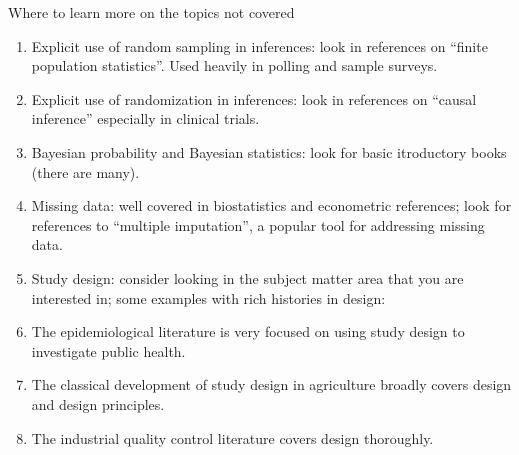 \documentclass[
  ignorenonframetext,
]{beamer}
\providecommand{\tightlist}{%
  \setlength{\itemsep}{0pt}\setlength{\parskip}{0pt}}
\begin{document}
\begin{frame}{Where to learn more on the topics not covered}
\protect\hypertarget{where-to-learn-more-on-the-topics-not-covered}{}

\begin{enumerate}
\tightlist
\item
  Explicit use of random sampling in inferences: look in references on
  ``finite population statistics''. Used heavily in polling and sample
  surveys.
\item
  Explicit use of randomization in inferences: look in references on
  ``causal inference'' especially in clinical trials.
\item
  Bayesian probability and Bayesian statistics: look for basic
  itroductory books (there are many).
\item
  Missing data: well covered in biostatistics and econometric
  references; look for references to ``multiple imputation'', a popular
  tool for addressing missing data.
\item
  Study design: consider looking in the subject matter area that you are
  interested in; some examples with rich histories in design:
\item
  The epidemiological literature is very focused on using study design
  to investigate public health.
\item
  The classical development of study design in agriculture broadly
  covers design and design principles.
\item
  The industrial quality control literature covers design thoroughly.
\end{enumerate}

\end{frame}
\end{document}
